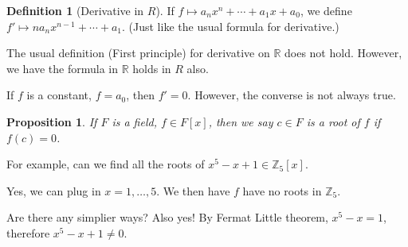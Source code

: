 \documentclass{article}
\theoremstyle{MyNonumberplain}
\theoremstyle{break}
\theoremstyle{break}
\newtheorem{proposition}{Proposition}[section]
\theoremstyle{break}
\theoremstyle{definition}
\theoremstyle{break}
\newtheorem{definition}{Definition}[section]
\begin{document}
\begin{defbox}
    \begin{definition}[Derivative in $R$]
        If $f \mapsto a_n x^n + \cdots + a_1 x + a_0$, we define $f' \mapsto n a_n
        x^{n - 1} + \cdots + a_1$. (Just like the usual formula for derivative.)
    \end{definition}
\end{defbox}
The usual definition (First principle) for derivative on $\mathbb{R}$ does not
hold. However, we have the formula in $\mathbb{R}$ holds in $R$
also.

If $f$ is a constant, $f = a_0$, then $f' = 0$. However, the converse is not
always true.

\begin{thmbox}
    \begin{proposition}
        If $F$ is a field, $f \in F [x]$, then we say $c \in F$ is a root
        of $f$ if $f (c) = 0$.
    \end{proposition}
\end{thmbox}

For example, can we find all the roots of $x^5 - x + 1 \in \mathbb{Z}_5 [x]$.

Yes, we can plug in $x = 1, \ldots, 5$. We then have $f$ have no roots in
$\mathbb{Z}_5$.

Are there any simplier ways? Also yes! By Fermat Little theorem, $x^5 - x =
1$, therefore $x^5 - x + 1 \neq 0$.
\end{document}
